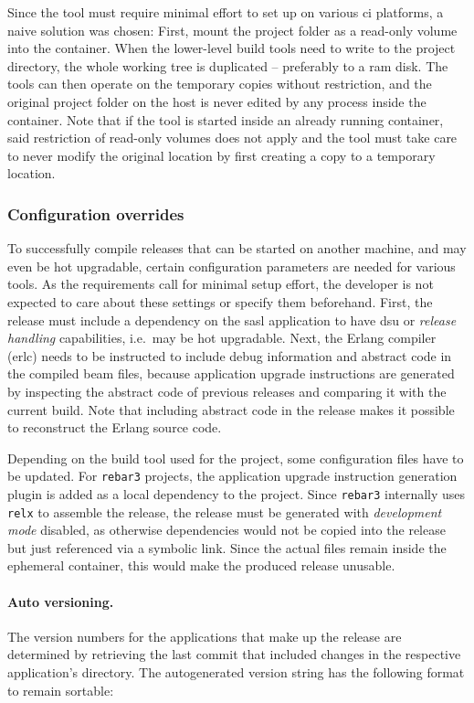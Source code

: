 Since the tool must require minimal effort to set up on various \acrshort{ci} platforms, a naive solution was chosen: First, mount the project folder as a read-only volume into the container. When the lower-level build tools need to write to the project directory, the whole working tree is duplicated -- preferably to a \acrshort{ram} disk. The tools can then operate on the temporary copies without restriction, and the original project folder on the host is never edited by any process inside the container. Note that if the tool is started inside an already running container, said restriction of read-only volumes does not apply and the tool must take care to never modify the original location by first creating a copy to a temporary location.


\subsubsection{Configuration overrides} To successfully compile releases that can be started on another machine, and may even be hot upgradable, certain configuration parameters are needed for various tools. As the requirements call for minimal setup effort, the developer is not expected to care about these settings or specify them beforehand. First, the release must include a dependency on the \acrfull{sasl} application to have \acrshort{dsu} or \emph{release handling} capabilities, i.e.~may be hot upgradable. Next, the Erlang compiler (erlc) needs to be instructed to include debug information and abstract code in the compiled \acrshort{beam} files, because application upgrade instructions are generated by inspecting the abstract code of previous releases and comparing it with the current build. Note that including abstract code in the release makes it possible to reconstruct the Erlang source code.~\cite{doc:otp}

Depending on the build tool used for the project, some configuration files have to be updated. For \lstinline|rebar3| projects, the application upgrade instruction generation plugin is added as a local dependency to the project. Since \lstinline|rebar3| internally uses \lstinline|relx| to assemble the release, the release must be generated with \emph{development mode} disabled, as otherwise dependencies would not be copied into the release but just referenced via a symbolic link. Since the actual files remain inside the ephemeral container, this would make the produced release unusable.

\cleardoublepage
\paragraph{Auto versioning.} The version numbers for the applications that make up the release are determined by retrieving the last commit that included changes in the respective application's directory. The autogenerated version string has the following format to remain sortable:


